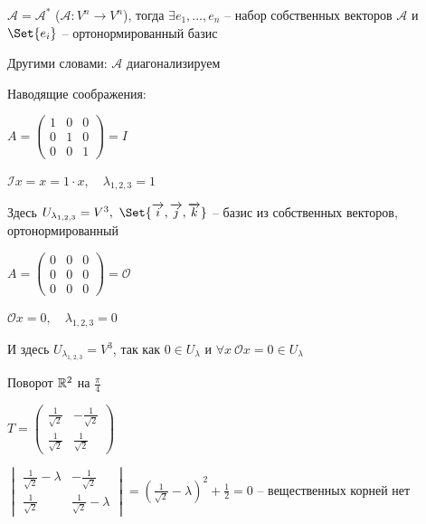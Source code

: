 \documentclass[12pt]{article}
\begin{document}
    \hypertarget{theoremabouteigenvectorsinselfconjugateoperator}{}

    \begin{MyTheorem}
        \Ths $\mathcal{A} = \mathcal{A}^*$ ($\mathcal{A} : V^n \to V^n$),
        тогда $\exists e_1, \dots, e_n$ -- набор собственных векторов $\mathcal{A}$ и $\Set{e_i}$ -- ортонормированный базис

        Другими словами: $\mathcal{A}$ диагонализируем
    \end{MyTheorem}

    Наводящие соображения:

     $A = \begin{pmatrix}1 & 0 & 0 \\ 0 & 1 & 0 \\ 0 & 0 & 1\end{pmatrix} = I$

    $\mathcal{I}x = x = 1 \cdot x, \quad \lambda_{1,2,3} = 1$

    Здесь $U_{\lambda_{1,2,3}} = V^3, \ \Set{\overrightarrow{i}, \overrightarrow{j}, \overrightarrow{k}}$ -- базис из собственных векторов, ортонормированный

     $A = \begin{pmatrix}0 & 0 & 0 \\ 0 & 0 & 0 \\ 0 & 0 & 0\end{pmatrix} = \mathcal{O}$

    $\mathcal{O}x = 0, \quad \lambda_{1,2,3} = 0$

    И здесь $U_{\lambda_{1,2,3}} = V^3$, так как $0 \in U_\lambda$ и $\forall x \ \mathcal{O}x = 0 \in U_\lambda$

     Поворот $\mathbb{R}^2$ на $\frac{\pi}{4}$

    $T = \begin{pmatrix}\frac{1}{\sqrt{2}} & -\frac{1}{\sqrt{2}} \\ \frac{1}{\sqrt{2}} & \frac{1}{\sqrt{2}}\end{pmatrix}$

    $\begin{vmatrix}\frac{1}{\sqrt{2}} - \lambda & -\frac{1}{\sqrt{2}} \\ \frac{1}{\sqrt{2}} & \frac{1}{\sqrt{2}} - \lambda\end{vmatrix} =
    \left(\frac{1}{\sqrt{2}} - \lambda\right)^2 + \frac{1}{2} = 0$ -- вещественных корней нет
\end{document}
